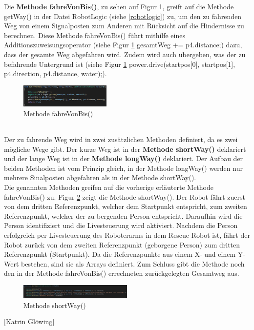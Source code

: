Die \textbf{Methode fahreVonBis()}, zu sehen auf Figur \ref{fig:fahrevonbis}, greift auf die Methode getWay() in der Datei RobotLogic (siehe \ref{robotlogic}) zu, um den zu fahrenden Weg von einem Signalposten zum Anderen mit Rücksicht auf die Hindernisse zu berechnen. Diese Methode fahreVonBis() führt mithilfe eines Additionszuweisungsoperator (siehe Figur \ref{fig:fahrevonbis} gesamtWeg += p4.distance;) dazu, dass der gesamte Weg abgefahren wird. Zudem wird auch übergeben, was der zu befahrende Untergrund ist (siehe Figur \ref{fig:fahrevonbis} power.drive(startpos[0], startpos[1], p4.direction, p4.distance, water);).
\begin{figure}[htbp] 
  \centering
     \includegraphics[width=0.4\textwidth]{Bilder/fahreVonBis.PNG}
  \caption{Methode fahreVonBis()}
  \label{fig:fahrevonbis}
\end{figure}\\
Der zu fahrende Weg wird in zwei zusätzlichen Methoden definiert, da es zwei mögliche Wege gibt. Der kurze Weg ist in der \textbf{Methode shortWay()} deklariert und der lange Weg ist in der \textbf{Methode longWay()} deklariert. Der Aufbau der beiden Methoden ist vom Prinzip gleich, in der Methode longWay() werden nur mehrere Sinalposten abgefahren als in der Methode shortWay().\\
Die genannten Methoden greifen auf die vorherige erläuterte Methode fahreVonBis() zu. Figur \ref{fig:shortway} zeigt die Methode shortWay(). Der Robot fährt zuerst von dem dritten Referenzpunkt, welcher dem Startpunkt entspricht, zum zweiten Referenzpunkt, welcher der zu bergenden Person entspricht. Daraufhin wird die Person identifiziert und die Livesteuerung wird aktiviert. Nachdem die Person erfolgreich per Livesteuerung des Roboterarms in dem Rescue Robot ist, fährt der Robot zurück von dem zweiten Referenzpunkt (geborgene Person) zum dritten Referenzpunkt (Startpunkt). Da die Referenzpunkte aus einem X- und einem Y-Wert bestehen, sind sie als Arrays definiert. Zum Schluss gibt die Methode noch den in der Methode fahreVonBis() errechneten zurückgelegten Gesamtweg aus.
\begin{figure}[htbp] 
  \centering
     \includegraphics[width=0.5\textwidth]{Bilder/shortWay.PNG}
  \caption{Methode shortWay()}
  \label{fig:shortway}
\end{figure}
\begin{flushright}
	$ [ $Katrin Glöwing$ ] $
\end{flushright}


